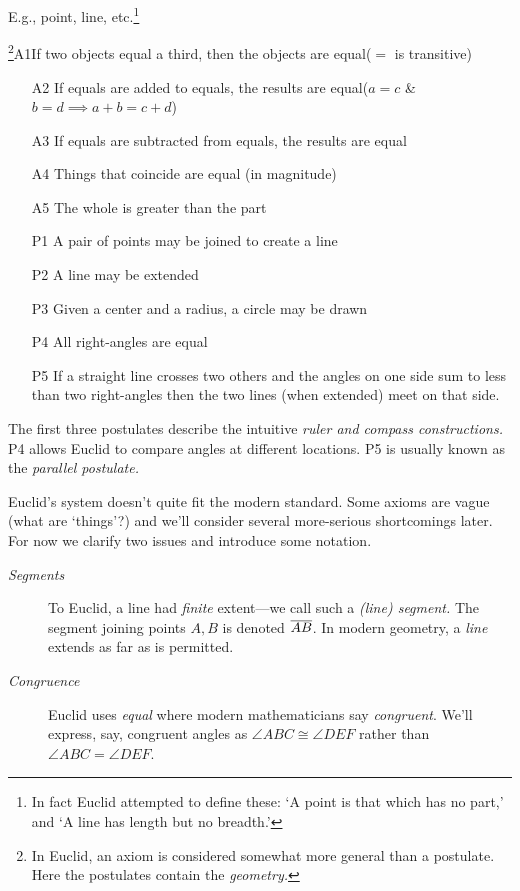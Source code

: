 
\begin{description}\itemsep0pt
	\item[\normalfont\emph{Undefined Terms}] E.g., point, line, etc.\footnote{In fact Euclid attempted to define these: `A point is that which has no part,' and `A line has length but no breadth.'}
	\item[\normalfont\emph{Axioms/Postulates}]\negthickspace\!\footnote{In Euclid, an axiom is considered somewhat more general than a postulate. Here the postulates contain the \emph{geometry.}}\lstsp A1\lstsp If two objects equal a third, then the objects are equal\hfill ($=$ is transitive)\vspace{-5pt}
	\begin{itemize}
		\item[A2] If equals are added to equals, the results are equal\hfill ($a=c$ \& $b=d\implies a+b=c+d$)
		\item[A3] If equals are subtracted from equals, the results are equal
		\item[A4] Things that coincide are equal (in magnitude)
		\item[A5] The whole is greater than the part
		\item[P1] A pair of points may be joined to create a line
		\item[P2] A line may be extended
		\item[P3] Given a center and a radius, a circle may be drawn
		\item[P4] All right-angles are equal
		\item[P5] If a straight line crosses two others and the angles on one side sum to less than two right-angles then the two lines (when extended) meet on that side.
	\end{itemize}
\end{description}

\goodbreak

The first three postulates describe the intuitive \emph{ruler and compass constructions.} P4 allows Euclid to compare angles at different locations. P5 is usually known as the \emph{parallel postulate.}
\bigbreak

Euclid's system doesn't quite fit the modern standard. Some axioms are vague (what are `things'?) and we'll consider several more-serious shortcomings later. For now we clarify two issues and introduce some notation.
\begin{description}
	\item[\normalfont\emph{Segments}] To Euclid, a line had \emph{finite} extent---we call such a \emph{(line) segment.} The segment joining points $A,B$ is denoted $\overline{AB}$. In modern geometry, a \emph{line} extends as far as is permitted.
	\item[\normalfont\emph{Congruence}] Euclid uses \emph{equal} where modern mathematicians say \emph{congruent}. We'll express, say, congruent angles as $\angle ABC\cong\angle DEF$ rather than $\angle ABC=\angle DEF$.
\end{description}


